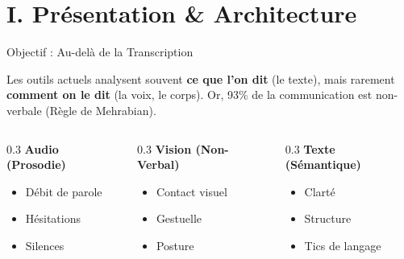 \documentclass[10pt,aspectratio=169]{beamer}
\begin{document}
\section{I. Présentation & Architecture}

\begin{frame}{Objectif : Au-delà de la Transcription}
    \begin{tcolorbox}[colback=primary!5, colframe=primary!30, title=Le Problème]
        \small
        Les outils actuels analysent souvent \textbf{ce que l'on dit} (le texte), mais rarement \textbf{comment on le dit} (la voix, le corps).
        Or, 93\% de la communication est non-verbale (Règle de Mehrabian).
    \end{tcolorbox}
    
    \vspace{0.5cm}
    
    \begin{columns}[T]
        \begin{column}{0.3\textwidth}
            \centering
            \textbf{\textcolor{primary}{Audio (Prosodie)}}
            \begin{itemize} \scriptsize
                \item Débit de parole
                \item Hésitations
                \item Silences
            \end{itemize}
        \end{column}
        \begin{column}{0.3\textwidth}
            \centering
            \textbf{\textcolor{accent}{Vision (Non-Verbal)}}
            \begin{itemize} \scriptsize
                \item Contact visuel
                \item Gestuelle
                \item Posture
            \end{itemize}
        \end{column}
        \begin{column}{0.3\textwidth}
            \centering
            \textbf{\textcolor{success}{Texte (Sémantique)}}
            \begin{itemize} \scriptsize
                \item Clarté
                \item Structure
                \item Tics de langage
            \end{itemize}
        \end{column}
    \end{columns}
\end{frame}
\end{document}
